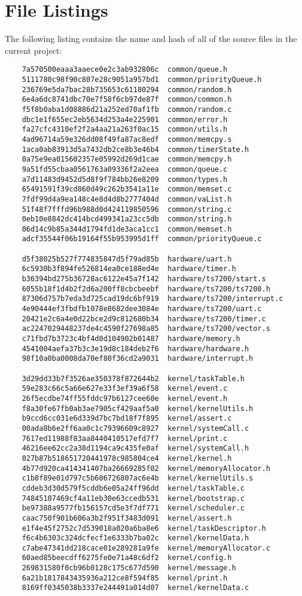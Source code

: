 \documentclass[twoside,a4paper]{refart}
\begin{document}
\section{File Listings}
The following listing contains the name and hash of all of the source files in the current project:
\begin{verbatim}
    7a570500eaaa3aaece0e2c3ab932806c  common/queue.h
    5111780c98f90c807e28c9051a957bd1  common/priorityQueue.h
    236769e5da7bac28b735653c61180294  common/random.h
    6e4a6dc8741dbc70e7f58f6cb97de87f  common/common.h
    f5f8b0aba1d08886d21a252ed70af1fb  common/random.c
    dbc1e1f655ec2eb5634d253a4e225901  common/error.h
    fa27cfc4310ef2f2a4aa21a263f0ac15  common/utils.h
    4ad96714a59e326dd08f49fa87ac8edf  common/memcpy.s
    1aca0ab83913d5a7432db2ce8b3e46b4  common/timerState.h
    0a75e9ea015602357e05992d269d1cae  common/memcpy.h
    9a51fd55cbaa0561763a09336f2a2eea  common/queue.c
    a7d11483d9452d5d8f9f784bb26e8209  common/types.h
    65491591f39cd860d49c262b3541a11e  common/memset.c
    7fdf99d4a9ea148c4e8d4d8b2777404d  common/vaList.h
    51f48f7fffd96b988d0d424119850596  common/string.c
    0eb10e8842dc414bcd499341a23cc5db  common/string.h
    06d14c9b85a344d1794fd1de3aca1cc1  common/memset.h
    adcf35544f06b19164f55b953995d1ff  common/priorityQueue.c

    d5f38025b527f774835847d5f79ad85b  hardware/uart.h
    6c5930b3f894fe526814ea0ce188ed4e  hardware/timer.h
    b36394bd275b36728ac6122e45a7f142  hardware/ts7200/start.s
    6055b18f1d4b2f2d6a200ff8cbcbeebf  hardware/ts7200/ts7200.h
    87306d757b7eda3d725cad19dc6bf919  hardware/ts7200/interrupt.c
    4e90444ef3fbdfb1078e8682dee3084e  hardware/ts7200/uart.c
    20421e2c6a4e0d22bce2d9c812680b34  hardware/ts7200/timer.c
    ac2247029448237de4c4590f27698a85  hardware/ts7200/vector.s
    c71fbd7b3723c4bf4d0d104902b01487  hardware/memory.h
    4541004aefa37b3c3e19d8c184deb2f6  hardware/hardware.h
    98f10a0ba0008da70ef80f36cd2a9031  hardware/interrupt.h

    3d29dd33b7f3526ae350378f872644b2  kernel/taskTable.h
    59e283c66c5a66e627e33f3ef39a6f58  kernel/event.c
    26f5ecdbe74ff55fddc97b6127cee60e  kernel/event.h
    f8a30fe67fb0ab3ae7905cf429aaf5a0  kernel/kernelUtils.h
    b9ccd6cc031e6d339d7bc7bd18f7f895  kernel/assert.c
    00ada8b6e2ff6aa0c1c79396609c8927  kernel/systemCall.c
    7617ed11988f83aa8440410517efd7f7  kernel/print.c
    46216ee62cc2a38d1194ca9c435fe0af  kernel/systemCall.h
    027b87b518651720441978c985804ce4  kernel/kernel.h
    4b77d920ca414341407ba26669285f02  kernel/memoryAllocator.h
    c1b8f89e01d797c5b606726807ac6e4b  kernel/kernelUtils.s
    cddeb3d30d579f5cddb6e05a24ff96dd  kernel/taskTable.c
    74845107469cf4a11eb30e63ccedb531  kernel/bootstrap.c
    be97388a9577fb156157cd5e3f7df771  kernel/scheduler.c
    caac750f901b606a3b2f951f3483d091  kernel/assert.h
    e1f4e45f2752c7d539018a020a6ba8e6  kernel/taskDescriptor.h
    f6c4b6303c324dcfecf1e6333b7ba02c  kernel/kernelData.h
    c7abe47341dd218cace01e289281a9fe  kernel/memoryAllocator.c
    60aed85beecdff6275fe0e71a48c6df2  kernel/config.h
    269831580f0cb96b0128c175c677d590  kernel/message.h
    6a21b1817843435936a212ce8f594f85  kernel/print.h
    8169ff0345038b3337e244491a014d07  kernel/kernelData.c


\end{verbatim}
\end{document}
